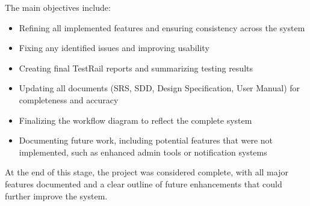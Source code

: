 \documentclass{article}
\begin{document}
The main objectives include:
\begin{itemize}
\item Refining all implemented features and ensuring consistency across the system
\item Fixing any identified issues and improving usability
\item Creating final TestRail reports and summarizing testing results
\item Updating all documents (SRS, SDD, Design Specification, User Manual) for completeness and accuracy
\item Finalizing the workflow diagram to reflect the complete system
\item Documenting future work, including potential features that were not implemented, such as enhanced admin tools or notification systems
\end{itemize}

\vspace{2mm}

\noindent At the end of this stage, the project was considered complete, with all major features documented and a clear outline of future enhancements that could further improve the system.
\end{document}
